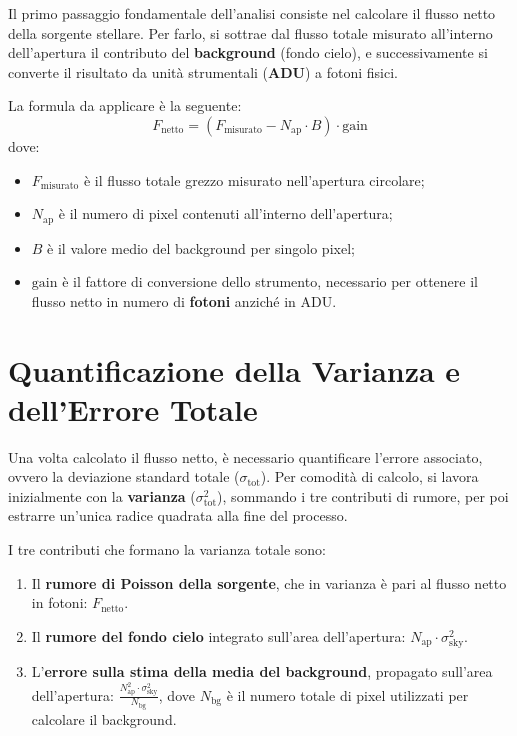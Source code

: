 Il primo passaggio fondamentale dell'analisi consiste nel calcolare il flusso netto della sorgente stellare. Per farlo, si sottrae dal flusso totale misurato all'interno dell'apertura il contributo del \textbf{background} (fondo cielo), e successivamente si converte il risultato da unità strumentali (\textbf{ADU}) a fotoni fisici.

La formula da applicare è la seguente:
\begin{equation}
F_{\text{netto}} = \left( F_{\text{misurato}} - N_{\text{ap}} \cdot B \right) \cdot \text{gain}
\end{equation}
dove:
\begin{itemize}
\item $F_{\text{misurato}}$ è il flusso totale grezzo misurato nell'apertura circolare;
\item $N_{\text{ap}}$ è il numero di pixel contenuti all'interno dell'apertura;
\item $B$ è il valore medio del background per singolo pixel;
\item $\text{gain}$ è il fattore di conversione dello strumento, necessario per ottenere il flusso netto in numero di \textbf{fotoni} anziché in ADU.
\end{itemize}

\section{Quantificazione della Varianza e dell'Errore Totale}

Una volta calcolato il flusso netto, è necessario quantificare l'errore associato, ovvero la deviazione standard totale ($\sigma_{\text{tot}}$). Per comodità di calcolo, si lavora inizialmente con la \textbf{varianza} ($\sigma_{\text{tot}}^2$), sommando i tre contributi di rumore, per poi estrarre un'unica radice quadrata alla fine del processo.

I tre contributi che formano la varianza totale sono:
\begin{enumerate}
\item Il \textbf{rumore di Poisson della sorgente}, che in varianza è pari al flusso netto in fotoni: $F_{\text{netto}}$.
\item Il \textbf{rumore del fondo cielo} integrato sull'area dell'apertura: $N_{\text{ap}} \cdot \sigma_{\text{sky}}^2$.
\item L'\textbf{errore sulla stima della media del background}, propagato sull'area dell'apertura: $\frac{N_{\text{ap}}^2 \cdot \sigma_{\text{sky}}^2}{N_{\text{bg}}}$, dove $N_{\text{bg}}$ è il numero totale di pixel utilizzati per calcolare il background.
\end{enumerate}

